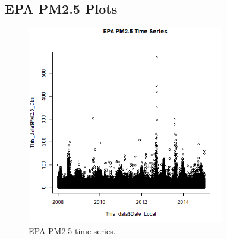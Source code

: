 
\subsection{EPA PM2.5 Plots}
\begin{figure} 
\centering 
\includegraphics[width=0.77\textwidth]{Code_Outputs/EPA_PM25_time_series.png} 
\caption{\label{fig:EPA_PM25TS}EPA PM2.5 time series.} 
\end{figure} 
 
